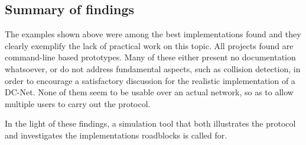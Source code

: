 \subsection{Summary of findings}
The examples shown above were among the best implementations found and they clearly exemplify the lack of practical work on this topic. All projects found are command-line based prototypes. Many of these either present no documentation whatsoever, or do not address fundamental aspects, such as collision detection, in order to encourage a satisfactory discussion for the realistic implementation of a DC-Net. None of them seem to be usable over an actual network, so as to allow multiple users to carry out the protocol.

In the light of these findings, a simulation tool that both illustrates the protocol and investigates the implementations roadblocks is called for.

